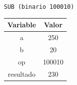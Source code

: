 \documentclass[letterpaper]{sae}
\begin{document}
\begin{figure}[H] %
\label{fig:test1}
\end{figure}

\verb+SUB (binario 100010)+\\

\begin{center}
	\begin{tabular}{|c|c|}
		\hline 
		Variable & Valor\tabularnewline
		\hline 
		\hline 
		a & 250\tabularnewline
		\hline 
		b & 20\tabularnewline
		\hline 
		op & 100010\tabularnewline
		\hline 
		resultado & 230\tabularnewline
		\hline 
	\end{tabular}
\end{center}
\end{document}
